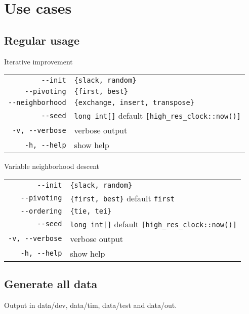 \newpage\cleardoublepage{}
\section{Use cases}

\subsection{Regular usage}


Iterative improvement


\begin{tabular}{rl}
\verb!--init! & \verb!{slack, random}!\\
\verb!--pivoting! & \verb!{first, best}!\\
\verb!--neighborhood! & \verb!{exchange, insert, transpose}!\\
\verb!--seed! & \verb!long int[]! default \verb![high_res_clock::now()]!\\
\verb!-v, --verbose! & verbose output\\
\verb!-h, --help! & show help\\
\end{tabular}

Variable neighborhood descent



\begin{tabular}{rl}
\verb!--init! & \verb!{slack, random}!\\
\verb!--pivoting! & \verb!{first, best}! default \verb!first!\\
\verb!--ordering! & \verb!{tie, tei}!\\
\verb!--seed! & \verb!long int[]! default \verb![high_res_clock::now()]!\\
\verb!-v, --verbose! & verbose output\\
\verb!-h, --help! & show help\\
\end{tabular}




\subsection{Generate all data}

Output in data/dev, data/tim, data/test and data/out.

